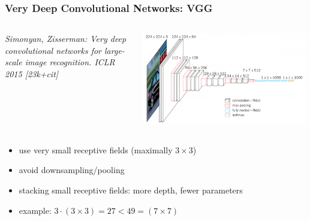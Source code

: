 \documentclass[compress]{beamer}
\newcommand{\is}[1]{\setlength{\itemsep}{#1}}
\begin{document}
\begin{frame} \frametitle{Very Deep Convolutional Networks: VGG}
\begin{columns}
\begin{column}{0.48\textwidth}
{\small \textit{Simonyan, Zisserman: Very deep convolutional networks for large-scale image recognition. ICLR 2015 [23k+cit]}}
\end{column}
\begin{column}{0.50\textwidth}
\begin{center}
\includegraphics[width=0.99\textwidth]{./figures/vgg.png}
\end{center}
\end{column}
\end{columns}
\begin{itemize} \is{2mm}
\item use very small receptive fields (maximally $3 \times 3$)
\item avoid downsampling/pooling
\item stacking small receptive fields: more depth, fewer parameters
\item example: $3 \cdot (3 \times 3) = 27 < 49= (7 \times 7)$
\end{itemize}
\end{frame}
\end{document}
